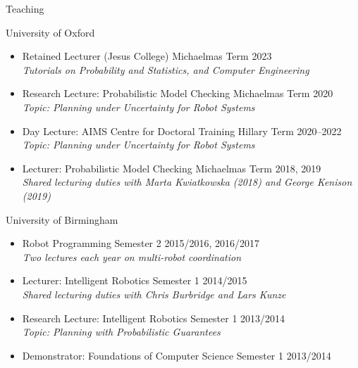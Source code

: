 
\begin{rSection}{Teaching}

\item University of Oxford
\begin{itemize}

\item Retained Lecturer (Jesus College) \hfill Michaelmas Term 2023\\
\textit{Tutorials on Probability and Statistics, and Computer Engineering}
\item Research Lecture: Probabilistic Model Checking   \hfill Michaelmas Term 2020\\
\textit{Topic: Planning under Uncertainty for Robot Systems }
\item Day Lecture: AIMS Centre for Doctoral Training   \hfill Hillary Term 2020--2022\\
\textit{Topic: Planning under Uncertainty for Robot Systems }
\item Lecturer: Probabilistic Model Checking  \hfill Michaelmas Term 2018, 2019\\
\textit{Shared lecturing duties with Marta Kwiatkowska (2018) and George Kenison (2019)}
\end{itemize}

\item University of Birmingham
\begin{itemize}

\item Robot Programming  \hfill Semester 2 2015/2016, 2016/2017\\
\textit{Two lectures each year on multi-robot coordination}
\item Lecturer: Intelligent Robotics \hfill Semester 1 2014/2015\\
\textit{Shared lecturing duties with Chris Burbridge and Lars Kunze}
\item Research Lecture: Intelligent Robotics \hfill Semester 1 2013/2014\\
\textit{Topic: Planning with Probabilistic Guarantees }
\item Demonstrator: Foundations of Computer Science \hfill Semester 1 2013/2014
\end{itemize}



\end{rSection}
